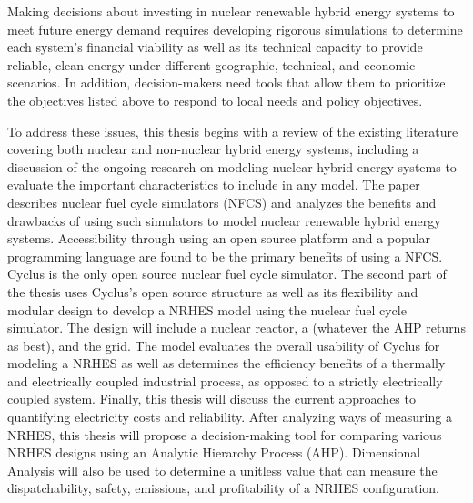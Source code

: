 \documentclass[12pt]{UIdahoMastersThesis}
\begin{document}
Making decisions about investing in nuclear renewable hybrid energy systems to meet future energy demand requires developing rigorous simulations to determine each system's financial viability as well as its technical capacity to provide reliable, clean energy under different geographic, technical, and economic scenarios. In addition, decision-makers need tools that allow them to prioritize the objectives listed above to respond to local needs and policy objectives.


To address these issues, this thesis begins with a review of the existing literature covering both nuclear and non-nuclear hybrid energy systems, including a discussion of the ongoing research on modeling nuclear hybrid energy systems to evaluate the important characteristics to include in any model. The paper describes nuclear fuel cycle simulators (NFCS) and analyzes the benefits and drawbacks of using such simulators to model nuclear renewable hybrid energy systems.  Accessibility through using an open source platform and a popular programming language are found to be the primary benefits of using a NFCS. Cyclus is the only open source nuclear fuel cycle simulator.
The second part of the thesis uses Cyclus's open source structure as well as its flexibility and modular design to develop a NRHES model using the nuclear fuel cycle simulator. The design will include a nuclear reactor, a (whatever the AHP returns as best), and the grid. The model evaluates the overall usability of Cyclus for modeling a NRHES as well as determines the efficiency benefits of a thermally and electrically coupled industrial process, as opposed to a strictly electrically coupled system.
Finally, this thesis will discuss the current approaches to quantifying electricity costs and reliability. After analyzing ways of measuring a NRHES, this thesis will propose a decision-making tool for comparing various NRHES designs using an Analytic Hierarchy Process (AHP).  Dimensional Analysis will also be used to determine a unitless value that can measure the dispatchability, safety, emissions, and profitability of a NRHES configuration.
\end{document}
